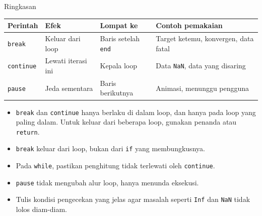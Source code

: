 \documentclass[aspectratio=169,10pt]{beamer}
\newcommand{\kode}[1]{\texttt{#1}}
\begin{document}
\begin{frame}[fragile]{Ringkasan}
  \centering
  \begin{tabular}{@{}llll@{}}
    \toprule
    Perintah & Efek & Lompat ke & Contoh pemakaian \\
    \midrule
    \kode{break}    & Keluar dari loop     & Baris setelah \kode{end} & Target ketemu, konvergen, data fatal \\
    \kode{continue} & Lewati iterasi ini   & Kepala loop             & Data \kode{NaN}, data yang disaring \\
    \kode{pause}    & Jeda sementara       & Baris berikutnya        & Animasi, menunggu pengguna \\
    \bottomrule
  \end{tabular}

  \vspace{12pt}
  \raggedright
  \begin{itemize}
    \item \kode{break} dan \kode{continue} hanya berlaku di dalam loop, dan hanya pada loop yang paling dalam.
          Untuk keluar dari beberapa loop, gunakan penanda atau \kode{return}.
    \item \kode{break} keluar dari \alert{loop}, bukan dari \kode{if} yang membungkusnya.
    \item Pada \kode{while}, pastikan penghitung tidak terlewati oleh \kode{continue}.
    \item \kode{pause} tidak mengubah alur loop, hanya menunda eksekusi.
    \item Tulis kondisi pengecekan yang jelas agar masalah seperti \kode{Inf} dan \kode{NaN} tidak lolos diam-diam.
  \end{itemize}
\end{frame}
\end{document}
